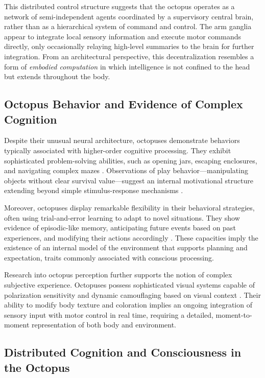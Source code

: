 \documentclass[12pt]{article}
\begin{document}
This distributed control structure suggests that the octopus operates as a network of semi-independent agents coordinated by a supervisory central brain, rather than as a hierarchical system of command and control. The arm ganglia appear to integrate local sensory information and execute motor commands directly, only occasionally relaying high-level summaries to the brain for further integration. From an architectural perspective, this decentralization resembles a form of \textit{embodied computation} in which intelligence is not confined to the head but extends throughout the body.

\subsection*{Octopus Behavior and Evidence of Complex Cognition}

Despite their unusual neural architecture, octopuses demonstrate behaviors typically associated with higher-order cognitive processing. They exhibit sophisticated problem-solving abilities, such as opening jars, escaping enclosures, and navigating complex mazes \cite{mather2008octopus}. Observations of play behavior—manipulating objects without clear survival value—suggest an internal motivational structure extending beyond simple stimulus-response mechanisms \cite{kuba2006playful}.

Moreover, octopuses display remarkable flexibility in their behavioral strategies, often using trial-and-error learning to adapt to novel situations. They show evidence of episodic-like memory, anticipating future events based on past experiences, and modifying their actions accordingly \cite{fidalgomathis2021octopus}. These capacities imply the existence of an internal model of the environment that supports planning and expectation, traits commonly associated with conscious processing.

Research into octopus perception further supports the notion of complex subjective experience. Octopuses possess sophisticated visual systems capable of polarization sensitivity and dynamic camouflaging based on visual context \cite{kelman2006polarization}. Their ability to modify body texture and coloration implies an ongoing integration of sensory input with motor control in real time, requiring a detailed, moment-to-moment representation of both body and environment.

\subsection*{Distributed Cognition and Consciousness in the Octopus}
\end{document}
